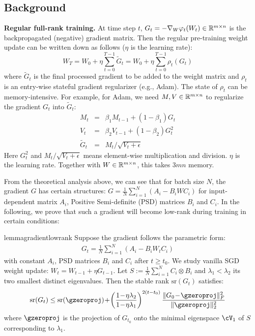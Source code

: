 \subsection{Background}

\textbf{Regular full-rank training.} At time step $t$, $G_t = -\nabla_W \varphi_t(W_t) \in \mathbb{R}^{m \times n}$ is the backpropagated (negative) gradient matrix. Then the regular pre-training weight update can be written down as follows ($\eta$ is the learning rate):
\begin{equation}
    W_T = W_0 + \eta \sum_{t=0}^{T-1} \tilde G_{t} = W_0 + \eta\sum_{t=0}^{T-1} \rho_t(G_t)
\end{equation}
where $\tilde G_t$ is the final processed gradient to be added to the weight matrix and $\rho_t$ is an entry-wise stateful gradient regularizer (e.g., Adam). The state of $\rho_t$ can be memory-intensive. For example, for Adam, we need $M,V \in \mathbb{R}^{m\times n}$ to regularize the gradient $G_t$ into $\tilde G_{t}$:
\begin{eqnarray}
    M_t &=& \beta_1 M_{t-1} + (1-\beta_1) G_t \\
    V_t &=& \beta_2 V_{t-1} + (1-\beta_2) G^2_t  \\
    \tilde G_t &=& M_t / \sqrt{V_t + \epsilon}
\end{eqnarray}
Here $G_t^2$ and $M_t / \sqrt{V_t + \epsilon}$ means element-wise multiplication and division. $\eta$ is the learning rate. Together with $W\in \mathbb{R}^{m\times n}$, this takes $3mn$ memory.

From the theoretical analysis above, we can see that for batch size $N$, the gradient $G$ has certain structures: $G = \frac{1}{N}\sum_{i=1}^N (A_i - B_i W C_i)$ for input-dependent matrix $A_i$, Positive Semi-definite (PSD) matrices $B_i$ and $C_i$. In the following, we prove that such a gradient will become low-rank during training in certain conditions:

\def\sr{\mathrm{sr}}

\begin{restatable}{lemma}{gradientlowrank}
\label{lemma:gradientlowrank}
    Suppose the gradient follows the parametric form:
    \begin{eqnarray}
          G_t=\frac{1}{N}\sum_{i=1}^N (A_i-B_i W_t C_i)\label{eq:constantgradientcoeff}
    \end{eqnarray}
    with constant $A_i$, PSD matrices $B_i$ and $C_i$ after $t \ge t_0$. We study vanilla SGD weight update: $W_t=W_{t-1}+\eta G_{t-1}$. Let $S := \frac{1}{N}\sum_{i=1}^N C_i \otimes B_i$ and $\lambda_1 < \lambda_2$ its two smallest distinct eigenvalues. Then the stable rank $\sr(G_t)$ satisfies:
    \begin{equation}
        \sr(G_t) \le \sr(\gzeroproj)\!+\!\left(\frac{1\!-\!\eta \lambda_2}{1\!-\!\eta \lambda_1}\right)^{2(t-t_0)} \frac{\|G_0\!-\!\gzeroproj\|_F^2}{\|\gzeroproj\|_2^2} \label{eq:stable-rank-decay}
    \end{equation}
    where $\gzeroproj$ is the projection of $G_{t_0}$ onto the minimal eigenspace $\cV_1$ of $S$ corresponding to $\lambda_1$.
\end{restatable}

